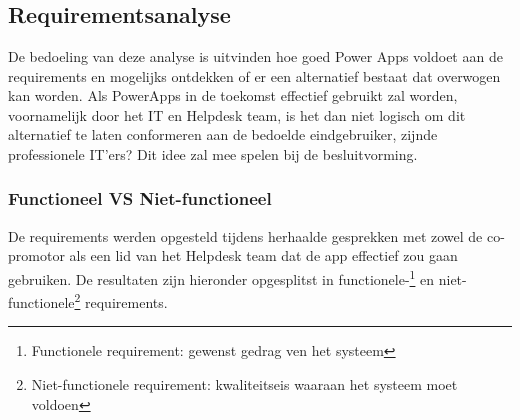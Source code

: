 
\chapter{}
\label{ch:methodologie}



\section{Requirementsanalyse}


De bedoeling van deze analyse is uitvinden hoe goed Power Apps voldoet aan de requirements en mogelijks ontdekken of er een alternatief bestaat dat overwogen kan worden. Als PowerApps in de toekomst effectief gebruikt zal worden, voornamelijk door het IT en Helpdesk team, is het dan niet logisch om dit alternatief te laten conformeren aan de bedoelde eindgebruiker, zijnde professionele IT'ers? Dit idee zal mee spelen bij de besluitvorming.

\subsection{Functioneel VS Niet-functioneel}
De requirements werden opgesteld tijdens herhaalde gesprekken met zowel de co-promotor als een lid van het Helpdesk team dat de app effectief zou gaan gebruiken.
De resultaten zijn hieronder opgesplitst in functionele-\footnote{Functionele requirement: gewenst gedrag ven het systeem} en niet-functionele\footnote{Niet-functionele requirement: kwaliteitseis waaraan het systeem moet voldoen} requirements.

